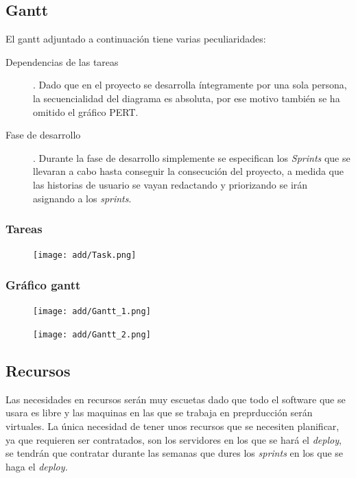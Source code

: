 \documentclass[12pt]{article} %
\begin{document}
\subsection{Gantt}
El gantt adjuntado a continuación tiene varias peculiaridades:
\begin{description}
\item [Dependencias de las tareas]. 
\linebreak Dado que en el proyecto se desarrolla íntegramente por una sola persona, la secuencialidad del diagrama es absoluta, por ese motivo también se ha omitido el gráfico PERT.
\item [Fase de desarrollo].
\linebreak Durante la fase de desarrollo simplemente se especifican los \textit{Sprints} que se llevaran a cabo hasta conseguir la consecución del proyecto, a medida que las historias de usuario se vayan redactando y priorizando se irán asignando a los \textit{sprints}.
\end{description}
\newpage

\begin{landscape}

\subsubsection{Tareas}

\begin{figure}[ht!]
\center
\texttt{[image: add/Task.png]}
\label{fig:task}
\end{figure}

\newpage
\subsubsection{Gráfico gantt}

\begin{figure}[ht!]
\center
\texttt{[image: add/Gantt\_1.png]}
\label{fig:gantt_1}
\end{figure}


\begin{figure}[ht!]
\center
\texttt{[image: add/Gantt\_2.png]}
\label{fig:gantt_2}
\end{figure}

\end{landscape}
\newpage

\subsection{Recursos}
Las necesidades en recursos serán muy escuetas dado que todo el software que se usara es libre y las maquinas en las que se trabaja en preprducción serán virtuales. La única necesidad de tener unos recursos que se necesiten planificar, ya que requieren ser contratados, son los servidores en los que se hará el \textit{deploy}, se tendrán que contratar durante las semanas que dures los \textit{sprints} en los que se haga el \textit{deploy.}
\end{document}
